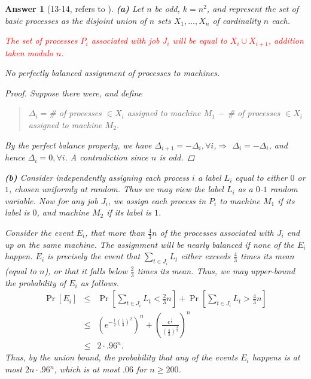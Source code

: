 \documentclass[11pt]{article}
\theoremstyle{numberplain}
\theoremstyle{nonumberplain}
\newtheorem{proof}{Proof}
\newtheorem{ans}{Answer}
\newcommand{\0}{{\mathbf{0}}}
\begin{document}
\begin{ans}[13-14, refers to \cite{solcornell}]
 {\bf (a)}
Let $n$ be odd, $k = n^2$, and represent the set of basic processes as the disjoint union of $n$ sets $X_1, \ldots, X_n$ of cardinality $n$ each.

\textcolor{red}{The set of processes $P_i$ associated with job $J_i$ will be equal to $X_i \cup X_{i+1}$, addition taken modulo $n$.}
\begin{claim}
No perfectly balanced assignment of processes to machines.
\end{claim}
\begin{proof} Suppose there were, and define 
\begin{quote}
$\Delta_i=$\# of processes $\in X_i$ assigned to machine $M_1$
$-$ \# of processes $\in X_i$ assigned
to machine $M_2$.
\end{quote}
By the perfect balance property, we have
$\Delta_{i+1} = - \Delta_i,\forall i$,$\Rightarrow$ $\Delta_i = - \Delta_i$, and hence $\Delta_i = 0,\forall i$.
A contradiction since $n$ is odd.
\end{proof}


{\bf (b)} Consider independently
assigning each process $i$ a {\em label} $L_i$
equal to either $0$ or $1$, chosen uniformly at random.
Thus we may view the label $L_i$ as a $0$-$1$ random variable.
Now for any job $J_i$, we assign each process in $P_i$
to machine $M_1$ if its label is $0$,
and machine $M_2$ if its label is $1$.

Consider the event $E_i$,
that more than $\frac43 n$ of the processes
associated with $J_i$ end up on the same machine.
The assignment will be nearly balanced if none of the $E_i$ happen.
$E_i$ is precisely the event that
$\sum_{t \in J_i} L_t$ either exceeds $\frac43$ times
its mean (equal to $n$), or that it falls below $\frac23$
times its mean.
Thus, we may upper-bound the probability of $E_i$ as follows.
\begin{eqnarray*}
\Pr[E_i] & \leq & \Pr[\sum_{t \in J_i} L_t < \frac23 n]
+ \Pr[\sum_{t \in J_i} L_t > \frac43 n] \\
& \leq & \left(e^{-\frac12 (\frac13)^2}\right)^n +
\left(\frac{e^{\frac13}}{\left(\frac43\right)^{\frac43}}\right)^n \\
& \leq & 2 \cdot .96^n.
\end{eqnarray*}
Thus, by the union bound, the probability that
any of the events $E_i$ happens is at most
$2 n \cdot .96^n$, which is
at most $.06$ for $n \geq 200$.


\end{ans}
\end{document}
